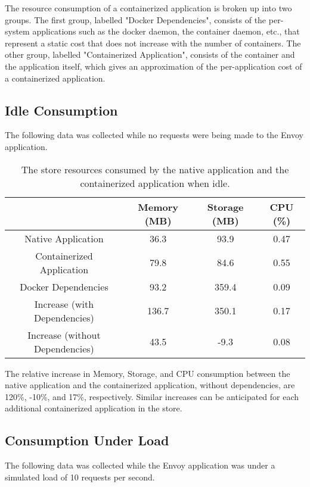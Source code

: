 \documentclass{article}
\begin{document}
The resource consumption of a containerized application is broken up into two groups. The first group, labelled "Docker Dependencies", consists of the per-system applications such as the docker daemon, the container daemon, etc., that represent a static cost that does not increase with the number of containers. The other group, labelled "Containerized Application", consists of the container and the application itself, which gives an approximation of the per-application cost of a containerized application.

\subsection{Idle Consumption}
The following data was collected while no requests were being made to the Envoy application.

\begin{table}[H]
\begin{tabular}{ |c|c|c|c| }
 \hline
   & Memory (MB) & Storage (MB) & CPU (\%) \\ 
 \hline
 Native Application & 36.3 & 93.9 & 0.47 \\
 \hline
 Containerized Application & 79.8 & 84.6 & 0.55 \\
 \hline
 Docker Dependencies & 93.2 & 359.4 & 0.09 \\
 \hline\hline
 Increase (with Dependencies) & 136.7 & 350.1 & 0.17 \\
 \hline
 Increase (without Dependencies) & 43.5 & -9.3 & 0.08 \\
 \hline
\end{tabular}
\caption{The store resources consumed by the native application and the containerized application when idle.}
\label{table:1}
\end{table}

The relative increase in Memory, Storage, and CPU consumption between the native application and the containerized application, without dependencies, are 120\%, -10\%, and 17\%, respectively. Similar increases can be anticipated for each additional containerized application in the store.

\subsection{Consumption Under Load}
The following data was collected while the Envoy application was under a simulated load of 10 requests per second.
\end{document}
